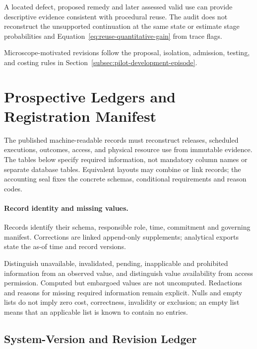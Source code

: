 \documentclass[10pt]{article} %
\providecommand{\1}{\mathbf{1}}  %
\theoremstyle{remark}
\theoremstyle{definition}
\begin{document}
A located defect, proposed remedy and later assessed valid use can provide
descriptive evidence consistent with procedural reuse. The audit does not
reconstruct the unsupported continuation at the same state or estimate stage probabilities
and Equation~\ref{eq:reuse-quantitative-gain} from trace flags.

Microscope-motivated revisions follow the proposal, isolation, admission,
testing, and costing rules in Section~\ref{subsec:pilot-development-episode}.


\section{Prospective Ledgers and Registration Manifest}
\label{app:ledgers-manifest}

The published machine-readable records must reconstruct releases, scheduled
executions, outcomes, access, and physical resource use from immutable
evidence. The tables below specify required information, not mandatory
column names or separate database tables. Equivalent layouts may combine
or link records; the accounting seal fixes the concrete schemas, conditional
requirements and reason codes.

\paragraph{Record identity and missing values.}
Records identify their schema, responsible role, time, commitment and
governing manifest. Corrections are linked append-only supplements;
analytical exports state the as-of time and record versions.

Distinguish unavailable, invalidated, pending, inapplicable and prohibited information
from an observed value, and distinguish value availability from access
permission. Computed but embargoed values are not uncomputed. Redactions
and reasons for missing required information remain explicit. Nulls and
empty lists do not imply zero cost, correctness, invalidity or exclusion;
an empty list means that an applicable list is known to contain no entries.

\subsection{System-Version and Revision Ledger}
\label{subsec:ledger-versions}
\end{document}
